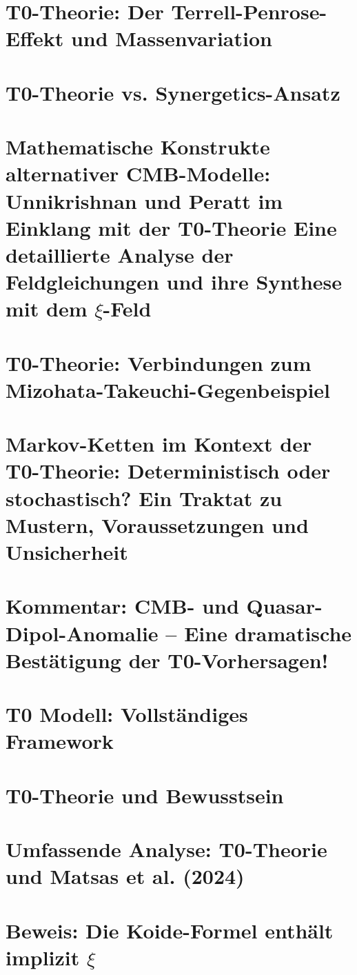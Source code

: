 	\chapter{T0-Theorie: Der Terrell-Penrose-Effekt und Massenvariation}
	
	\chapter{T0-Theorie vs. Synergetics-Ansatz}
	
	\chapter{Mathematische Konstrukte alternativer CMB-Modelle: Unnikrishnan und Peratt im Einklang mit der T0-Theorie Eine detaillierte Analyse der Feldgleichungen und ihre Synthese mit dem $\xi$-Feld}
	
	\chapter{T0-Theorie: Verbindungen zum Mizohata-Takeuchi-Gegenbeispiel}
	
	\chapter{Markov-Ketten im Kontext der T0-Theorie: Deterministisch oder stochastisch? Ein Traktat zu Mustern, Voraussetzungen und Unsicherheit}
	
	\chapter{Kommentar: CMB- und Quasar-Dipol-Anomalie -- Eine dramatische Bestätigung der T0-Vorhersagen!}
	
	\chapter{T0 Modell: Vollständiges Framework}
	
	\chapter{T0-Theorie und Bewusstsein}
	
	\chapter{Umfassende Analyse: T0-Theorie und Matsas et al. (2024)}
	
	\chapter{Beweis: Die Koide-Formel enthält implizit $\xi$}
	
